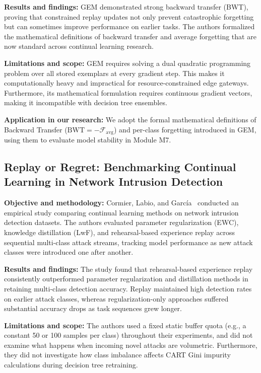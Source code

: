 \smallskip
\noindent\textbf{Results and findings:} GEM demonstrated strong backward transfer (BWT), proving that constrained replay updates not only prevent catastrophic forgetting but can sometimes improve performance on earlier tasks. The authors formalized the mathematical definitions of backward transfer and average forgetting that are now standard across continual learning research.

\smallskip
\noindent\textbf{Limitations and scope:} GEM requires solving a dual quadratic programming problem over all stored exemplars at every gradient step. This makes it computationally heavy and impractical for resource-constrained edge gateways. Furthermore, its mathematical formulation requires continuous gradient vectors, making it incompatible with decision tree ensembles.

\smallskip
\noindent\textbf{Application in our research:} We adopt the formal mathematical definitions of Backward Transfer ($\text{BWT} = -\mathcal{F}_{\text{avg}}$) and per-class forgetting introduced in GEM, using them to evaluate model stability in Module M7.

\subsection{Replay or Regret: Benchmarking Continual Learning in Network Intrusion Detection}

\noindent\textbf{Objective and methodology:} Cormier, Labio, and Garc{\'i}a~\cite{replay_or_regret2023} conducted an empirical study comparing continual learning methods on network intrusion detection datasets. The authors evaluated parameter regularization (EWC), knowledge distillation (LwF), and rehearsal-based experience replay across sequential multi-class attack streams, tracking model performance as new attack classes were introduced one after another.

\smallskip
\noindent\textbf{Results and findings:} The study found that rehearsal-based experience replay consistently outperformed parameter regularization and distillation methods in retaining multi-class detection accuracy. Replay maintained high detection rates on earlier attack classes, whereas regularization-only approaches suffered substantial accuracy drops as task sequences grew longer.

\smallskip
\noindent\textbf{Limitations and scope:} The authors used a fixed static buffer quota (e.g., a constant 50 or 100 samples per class) throughout their experiments, and did not examine what happens when incoming novel attacks are volumetric. Furthermore, they did not investigate how class imbalance affects CART Gini impurity calculations during decision tree retraining.

